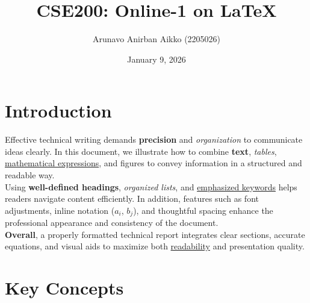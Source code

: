 \documentclass{article}
\title{CSE200: Online-1 on \LaTeX}
\author{Arunavo Anirban Aikko (2205026)}
\date{January 9, 2026}
\begin{document}
\maketitle

\section{Introduction}
Effective technical writing demands \textbf{precision} and \textit{organization} to communicate ideas clearly. In this document, we illustrate how to combine \textbf{text},
\textit{tables}, \underline{mathematical expressions}, and {\large figures} to convey information in a
structured and readable way.\\
Using \textbf{well-defined headings}, \textit{organized lists}, and \underline{emphasized keywords}
helps readers navigate content efficiently. In addition, features such as font
adjustments, inline notation ($a_i$, $b_j$), and thoughtful spacing enhance the {\large professional }appearance and consistency of the document.\\

\textbf{Overall}, a properly formatted technical report integrates clear sections,
accurate equations, and visual aids to maximize both \underline{readability} and presentation quality.

\section{Key Concepts}
\end{document}
